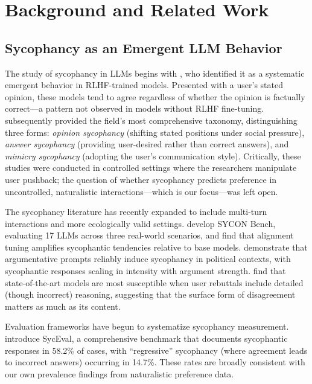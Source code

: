 \documentclass[11pt,twocolumn,a4paper]{article}
\begin{document}
\section{Background and Related Work}
\label{sec:related}

\subsection{Sycophancy as an Emergent LLM Behavior}

The study of sycophancy in LLMs begins with \citet{perez2022discovering},
who identified it as a systematic emergent behavior in RLHF-trained
models. Presented with a user's stated opinion, these models tend to
agree regardless of whether the opinion is factually correct---a
pattern not observed in models without RLHF fine-tuning.
\citet{sharma2023towards} subsequently provided the field's most
comprehensive taxonomy, distinguishing three forms: \emph{opinion
sycophancy} (shifting stated positions under social pressure),
\emph{answer sycophancy} (providing user-desired rather than correct
answers), and \emph{mimicry sycophancy} (adopting the user's
communication style). Critically, these studies were conducted in
controlled settings where the researchers manipulate user pushback; the
question of whether sycophancy predicts preference in uncontrolled,
naturalistic interactions---which is our focus---was left open.

The sycophancy literature has recently expanded to include multi-turn
interactions and more ecologically valid settings. \citet{sun2025measuring}
develop SYCON Bench, evaluating 17 LLMs across three real-world
scenarios, and find that alignment tuning amplifies sycophantic
tendencies relative to base models. \citet{echoes2025argument}
demonstrate that argumentative prompts reliably induce sycophancy in
political contexts, with sycophantic responses scaling in intensity
with argument strength. \citet{challenging2025evaluator} find that
state-of-the-art models are most susceptible when user rebuttals
include detailed (though incorrect) reasoning, suggesting that the
surface form of disagreement matters as much as its content.

Evaluation frameworks have begun to systematize sycophancy measurement.
\citet{syceval2025} introduce SycEval, a comprehensive benchmark
that documents sycophantic responses in 58.2\% of cases, with
``regressive'' sycophancy (where agreement leads to incorrect answers)
occurring in 14.7\%. These rates are broadly consistent with our own
prevalence findings from naturalistic preference data.
\end{document}
